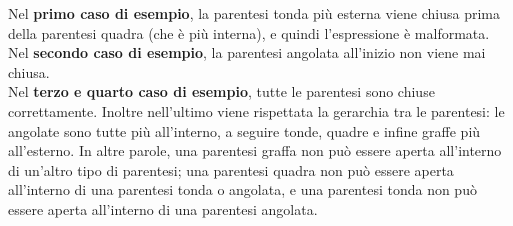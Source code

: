\Examples
\begin{example}
%
\end{example}
\begin{example}
%
\end{example}
\begin{example}
%
\end{example}
\begin{example}
%
\end{example}


\Explanation
Nel \textbf{primo caso di esempio}, la parentesi tonda più esterna viene chiusa prima della parentesi quadra (che è più interna), e quindi l'espressione è malformata.\\[2mm]
Nel \textbf{secondo caso di esempio}, la parentesi angolata all'inizio non viene mai chiusa.\\[2mm]
Nel \textbf{terzo e quarto caso di esempio}, tutte le parentesi sono chiuse correttamente. Inoltre nell'ultimo viene rispettata la gerarchia tra le parentesi: le angolate sono tutte più all'interno, a seguire tonde, quadre e infine graffe più all'esterno. In altre parole, una parentesi graffa non può essere aperta all'interno di un'altro tipo di parentesi; una parentesi quadra non può essere aperta all'interno di una parentesi tonda o angolata, e una parentesi tonda non può essere aperta all'interno di una parentesi angolata.
